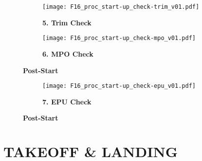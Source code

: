\begin{figure}[h]
    \centering
    \begin{subfigure}[t]{0.45\linewidth}
        \centering
        \texttt{[image: F16\_proc\_start-up\_check-trim\_v01.pdf]}
        \caption*{\textbf{5. Trim Check}}
    \end{subfigure}
    \begin{subfigure}[t]{0.45\linewidth}
        \centering
        \texttt{[image: F16\_proc\_start-up\_check-mpo\_v01.pdf]}
        \caption*{\textbf{6. MPO Check}}
    \end{subfigure}
    \caption{\textbf{Post-Start}}
    \label{fig:proc:testschecks3}
\end{figure}

\clearpage

\begin{tablenumerate}[resume]
\end{tablenumerate}

\begin{figure}[h]
    \centering
    \begin{subfigure}[t]{0.45\linewidth}
        \centering
        \texttt{[image: F16\_proc\_start-up\_check-epu\_v01.pdf]}
        \caption*{\textbf{7. EPU Check}}
    \end{subfigure}
    \caption{\textbf{Post-Start}}
    \label{fig:proc:testschecks4}
\end{figure}

\clearpage

\section{TAKEOFF \& LANDING}



\cleardoublepage